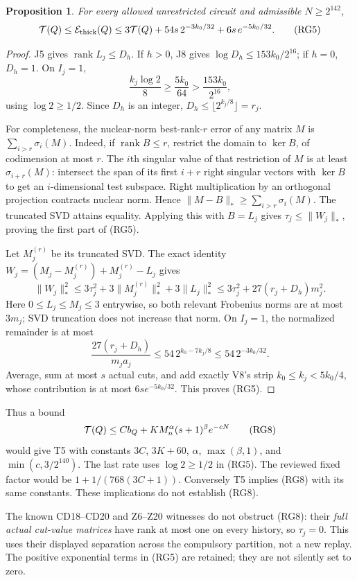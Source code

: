 \documentclass[11pt]{article}
\newtheorem{proposition}{Proposition}
\begin{document}
\begin{proposition}
For every allowed unrestricted circuit and admissible $N\ge2^{142}$,
\[
 {\cal T}(Q)\le{\cal E}_{\rm thick}(Q)
 \le3{\cal T}(Q)+54s\,2^{-3k_0/32}
                         +6s\,e^{-5k_0/32}.                    \tag{RG5}
\]
\end{proposition}
\begin{proof}
J5 gives $\operatorname{rank}L_j\le D_h$. If $h>0$, J8 gives
$\log D_h\le153k_0/2^{16}$; if $h=0$, $D_h=1$.
On $I_j=1$,
\[
 \frac{k_j\log2}{8}\ge\frac{5k_0}{64}
                         >\frac{153k_0}{2^{16}},
\]
using $\log2\ge1/2$. Since $D_h$ is an integer,
$D_h\le\lfloor2^{k_j/8}\rfloor=r_j$.

For completeness, the nuclear-norm best-rank-$r$ error of any matrix
$M$ is $\sum_{i>r}\sigma_i(M)$. Indeed, if $\operatorname{rank}B\le r$,
restrict the domain to $\ker B$, of codimension at most $r$.
The $i$th singular value of that restriction of $M$ is at least
$\sigma_{i+r}(M)$: intersect the span of its first $i+r$ right singular
vectors with $\ker B$ to get an $i$-dimensional test subspace.
Right multiplication by an orthogonal projection contracts nuclear
norm. Hence $\|M-B\|_*\ge\sum_{i>r}\sigma_i(M)$.
The truncated SVD attains equality. Applying this with $B=L_j$
gives $\tau_j\le\|W_j\|_*$, proving the first part of (RG5).

Let $M_j^{(r)}$ be its truncated SVD. The exact identity
$W_j=(M_j-M_j^{(r)})+M_j^{(r)}-L_j$ gives
\[
 \|W_j\|_*^2
 \le3\tau_j^2+3\|M_j^{(r)}\|_*^2+3\|L_j\|_*^2
 \le3\tau_j^2+27(r_j+D_h)m_j^2.                         \tag{RG6}
\]
Here $0\le L_j\le M_j\le3$ entrywise, so both relevant Frobenius
norms are at most $3m_j$; SVD truncation does not increase that norm.
On $I_j=1$, the normalized remainder is at most
\[
 \frac{27(r_j+D_h)}{m_ja_j}
 \le54\,2^{k_0-7k_j/8}\le54\,2^{-3k_0/32}.              \tag{RG7}
\]
Average, sum at most $s$ actual cuts, and add exactly V8's strip
$k_0\le k_j<5k_0/4$, whose contribution is at most
$6s e^{-5k_0/32}$. This proves (RG5).
\end{proof}

Thus a bound
\[
 {\cal T}(Q)\le Cb_Q+K M_n^\alpha(s+1)^\beta e^{-cN}             \tag{RG8}
\]
would give T5 with constants
$3C$, $3K+60$, $\alpha$, $\max(\beta,1)$, and
$\min(c,3/2^{140})$. The last rate uses $\log2\ge1/2$ in
(RG5). The reviewed fixed factor would be
$1+1/(768(3C+1))$. Conversely T5 implies (RG8) with its same
constants. These implications do not establish (RG8).

The known CD18--CD20 and Z6--Z20 witnesses do not obstruct (RG8):
their \emph{full actual cut-value matrices} have rank at most one
on every history, so $\tau_j=0$. This uses their displayed
separation across the compulsory partition, not a new replay.
The positive exponential terms in (RG5) are retained; they are not
silently set to zero.
\end{document}
